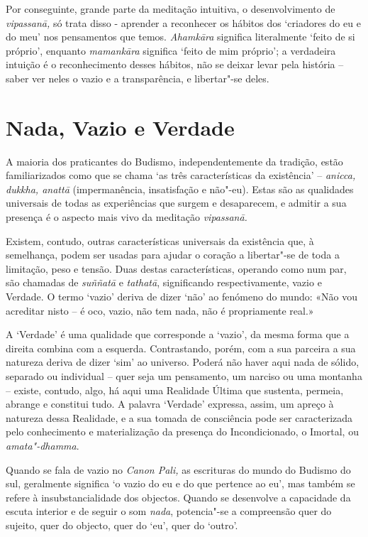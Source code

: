 Por conseguinte, grande parte da meditação intuitiva, o desenvolvimento
de \emph{vipassanā,} só trata disso - aprender a reconhecer os hábitos
dos `criadores do eu e do meu' nos pensamentos que temos.
\emph{Ahamkāra} significa literalmente `feito de si próprio', enquanto
\emph{mamankāra} significa `feito de mim próprio'; a verdadeira intuição
é o reconhecimento desses hábitos, não se deixar levar pela história --
saber ver neles o vazio e a transparência, e libertar"-se deles.

\section{Nada, Vazio e Verdade}

A maioria dos praticantes do Budismo, independentemente da tradição,
estão familiarizados como que se chama `as três características da
existência' -- \emph{anicca, dukkha, anattā} (impermanência,
insatisfação e não"-eu). Estas são as qualidades universais de todas as
experiências que surgem e desaparecem, e admitir a sua presença é o
aspecto mais vivo da meditação \emph{vipassanā.}

Existem, contudo, outras características universais da existência que, à
semelhança, podem ser usadas para ajudar o coração a libertar"-se de toda
a limitação, peso e tensão. Duas destas características, operando como
num par, são chamadas de \emph{suññatā} e \emph{tathatā}, significando
respectivamente, vazio e Verdade. O termo `vazio' deriva de dizer `não'
ao fenómeno do mundo: «Não vou acreditar nisto -- é oco, vazio, não tem
nada, não é propriamente real.»

A `Verdade' é uma qualidade que corresponde a `vazio', da mesma forma
que a direita combina com a esquerda. Contrastando, porém, com a sua
parceira a sua natureza deriva de dizer `sim' ao universo. Poderá não
haver aqui nada de sólido, separado ou individual -- quer seja um
pensamento, um narciso ou uma montanha -- existe, contudo, algo, há aqui
uma Realidade Última que sustenta, permeia, abrange e constitui tudo. A
palavra `Verdade' expressa, assim, um apreço à natureza dessa Realidade,
e a sua tomada de consciência pode ser caracterizada pelo conhecimento e
materialização da presença do Incondicionado, o Imortal, ou
\emph{amata"-dhamma}.

Quando se fala de vazio no \emph{Canon Pali,} as escrituras do mundo do
Budismo do sul, geralmente significa `o vazio do eu e do que pertence ao
eu', mas também se refere à insubstancialidade dos objectos. Quando se
desenvolve a capacidade da escuta interior e de seguir o som
\emph{nada}, potencia"-se a compreensão quer do sujeito, quer do objecto,
quer do `eu', quer do `outro'.


